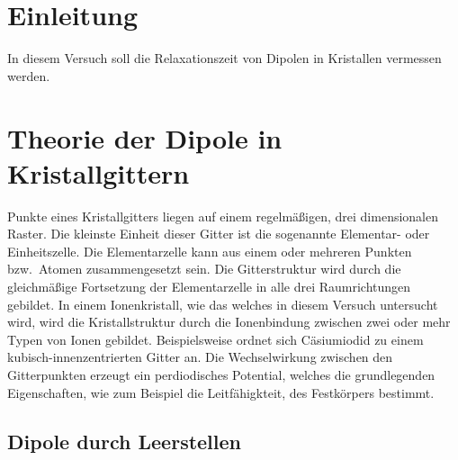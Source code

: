 \section{Einleitung}
In diesem Versuch soll die Relaxationszeit von Dipolen in Kristallen vermessen werden.



\section{Theorie der Dipole in Kristallgittern}
\label{sec:theorie}

Punkte eines Kristallgitters liegen auf einem regelmäßigen, drei dimensionalen Raster.
Die kleinste Einheit dieser Gitter ist die sogenannte Elementar- oder Einheitszelle.
Die Elementarzelle kann aus einem oder mehreren Punkten bzw.\ Atomen zusammengesetzt sein.
Die Gitterstruktur wird durch die gleichmäßige Fortsetzung der Elementarzelle in alle drei Raumrichtungen gebildet.
In einem Ionenkristall, wie das welches in diesem Versuch untersucht wird,
wird die Kristallstruktur durch die Ionenbindung zwischen zwei oder mehr Typen von Ionen gebildet.
Beispielsweise ordnet sich Cäsiumiodid zu einem kubisch-innenzentrierten Gitter an.
Die Wechselwirkung zwischen den Gitterpunkten erzeugt ein perdiodisches Potential,
welches die grundlegenden Eigenschaften,
wie zum Beispiel die Leitfähigkteit, des Festkörpers bestimmt.


\subsection{Dipole durch Leerstellen}

